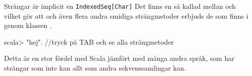 \begin{Slide}{Strängar är implicit en \texttt{IndexedSeq[Char]}}\SlideFontSmall
Det finns en så kallad  mellan  och  vilket gör att  och även flera andra smidiga strängmetoder erbjuds  de som finns i \href{http://docs.oracle.com/javase/8/docs/api/java/lang/String.html}{} genom klassen \href{http://www.scala-lang.org/api/current/scala/collection/immutable/StringOps.html}{}.

\vspace{0.5em}
\begin{REPLnonum}
scala> "hej".  //tryck på TAB och se alla strängmetoder
\end{REPLnonum}
Detta är en stor fördel med Scala jämfört med många andra språk, som har strängar som inte kan allt som andra sekvenssamlingar kan.
\end{Slide}


%
%
%
%




